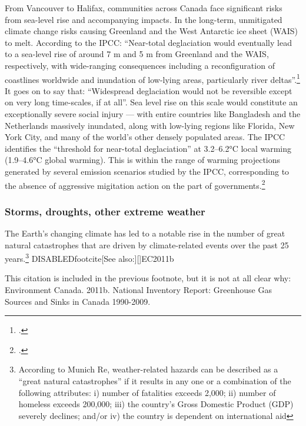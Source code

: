 From Vancouver to Halifax, communities across Canada face significant risks from sea-level rise and accompanying impacts.
In the long-term, unmitigated climate change risks causing Greenland and the West Antarctic ice sheet (WAIS) to melt.
According to the IPCC: ``Near-total deglaciation would eventually lead to a sea-level rise of around 7 m and 5 m from Greenland and the WAIS, respectively, with wide-ranging consequences including a reconfiguration of coastlines worldwide and inundation of low-lying areas, particularly river deltas''.\footcite[][See: "Deglaciation of West Antarctic and Greenland ice sheets" \url{https://www.ipcc.ch/publications_and_data/ar4/wg2/en/ch19s19-3-5-2.html}]{IPCC2007}
It goes on to say that: ``Widespread deglaciation would not be reversible except on very long time-scales, if at all''.
Sea level rise on this scale would constitute an exceptionally severe social injury --- with entire countries like Bangladesh and the Netherlands massively inundated, along with low-lying regions like Florida, New York City, and many of the world's other densely populated areas.
The IPCC identifies the ``threshold for near-total deglaciation'' at 3.2--6.2°C local warming (1.9--4.6°C global warming).
This is within the range of warming projections generated by several emission scenarios studied by the IPCC, corresponding to the absence of aggressive migitation action on the part of governments.\footcite[][See: "Projected climate change an its impacts" \url{https://www.ipcc.ch/publications_and_data/ar4/syr/en/spms3.html}"]{IPCC2007}


	
	\subsubsection{Storms, droughts, other extreme weather}



The Earth's changing climate has led to a notable rise in the number of great natural catastrophes that are driven by climate-related events over the past 25 years.\footnote{According to Munich Re, weather-related hazards can be described as a ``great natural catastrophes'' if it results in any one or a combination of the following attributes: i) number of fatalities exceeds 2,000; ii) number of homeless exceeds 200,000; iii) the country’s Gross Domestic Product (GDP) severely declines; and/or iv) the country is dependent on international aid} DISABLEDfootcite[See also:][]{EC2011b}

\begin{vcom}
This citation is included in the previous footnote, but it is not at all clear why: Environment Canada. 2011b. National Inventory Report: Greenhouse Gas Sources and Sinks in Canada 1990-2009.
\end{vcom}

